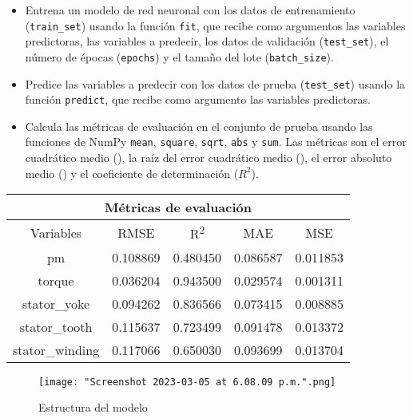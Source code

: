 \documentclass{article}
\begin{document}
\begin{itemize}
\item Entrena un modelo de red neuronal con los datos de entrenamiento (\lstinline{train_set}) usando la función \lstinline{fit}, que recibe como argumentos las variables predictoras, las variables a predecir, los datos de validación (\lstinline{test_set}), el número de épocas (\lstinline{epochs}) y el tamaño del lote (\lstinline{batch_size}).
\item Predice las variables a predecir con los datos de prueba (\lstinline{test_set}) usando la función \lstinline{predict}, que recibe como argumento las variables predictoras.
\item Calcula las métricas de evaluación en el conjunto de prueba usando las funciones de NumPy \lstinline{mean}, \lstinline{square}, \lstinline{sqrt}, \lstinline{abs} y \lstinline{sum}. Las métricas son el error cuadrático medio (), la raíz del error cuadrático medio (), el error absoluto medio () y el coeficiente de determinación ($R^{2}$).
\end{itemize}


\begin{center}
\begin{tabular}{ |c|c|c|c|c| }
\toprule
\multicolumn{5}{|c|}{Métricas de evaluación} \\
\midrule
Variables & RMSE & R\textsuperscript{2} & MAE & MSE \\
\midrule
pm & 0.108869 & 0.480450 & 0.086587 & 0.011853 \\
torque & 0.036204 & 0.943500 & 0.029574 & 0.001311 \\
stator\_yoke & 0.094262 & 0.836566 & 0.073415 & 0.008885 \\
stator\_tooth & 0.115637 & 0.723499 & 0.091478 & 0.013372 \\
stator\_winding & 0.117066 & 0.650030 & 0.093699 & 0.013704 \\
\bottomrule
\end{tabular}
\end{center}

\begin{figure}[htbp]
\centering
\caption{Estructura del modelo}
\texttt{[image: "Screenshot 2023-03-05 at 6.08.09 p.m.".png]}
\end{figure}

\pagebreak





\end{document}

